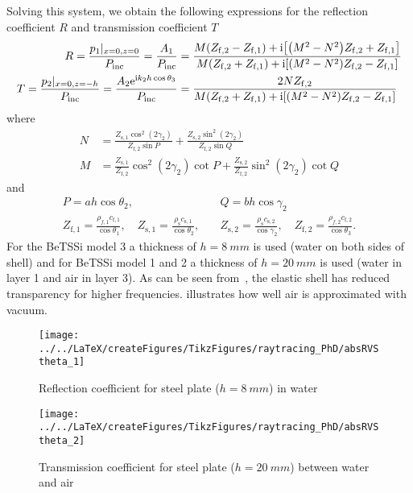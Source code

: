 Solving this system, we obtain the following expressions for the reflection coefficient $R$ and transmission coefficient $T$
\begin{align*}
	R =\frac{p_1\vert_{x=0,z=0}}{P_{\mathrm{inc}}} = \frac{A_1}{P_{\mathrm{inc}}} &= \frac{M(Z_{\mathrm{f},2}-Z_{\mathrm{f},1}) + \imag\left[\left(M^2-N^2\right)Z_{\mathrm{f},2}+Z_{\mathrm{f},1}\right]}{M(Z_{\mathrm{f},2}+Z_{\mathrm{f},1}) + \imag\left[\left(M^2-N^2\right)Z_{\mathrm{f},2}-Z_{\mathrm{f},1}\right]}\\
	T = \frac{p_2\vert_{x=0,z=-h}}{P_{\mathrm{inc}}} = \frac{A_2\euler^{\imag k_2 h \cos\theta_3}}{P_{\mathrm{inc}}} &= \frac{2NZ_{\mathrm{f},2}}{M(Z_{\mathrm{f},2}+Z_{\mathrm{f},1}) + \imag\left[\left(M^2-N^2\right)Z_{\mathrm{f},2}-Z_{\mathrm{f},1}\right]}
\end{align*}
where
\begin{align*}
	N &= \frac{Z_{\mathrm{s},1}\cos^2(2\gamma_2)}{Z_{\mathrm{f},2}\sin P} + \frac{Z_{\mathrm{s},2}\sin^2(2\gamma_2)}{Z_{\mathrm{f},2}\sin Q}\\
	M &= \frac{Z_{\mathrm{s},1}}{Z_{\mathrm{f},2}}\cos^2(2\gamma_2)\cot P + \frac{Z_{\mathrm{s},2}}{Z_{\mathrm{f},2}}\sin^2(2\gamma_2)\cot Q
\end{align*}
and
\begin{align*}
	P = a h\cos\theta_2,&\quad Q = b h\cos\gamma_2\\
	Z_{\mathrm{f},1} = \frac{\rho_{f,1} c_{\mathrm{f},1}}{\cos\theta_1},\quad Z_{\mathrm{s},1} = \frac{\rho_{\mathrm{s}} c_{\mathrm{s},1}}{\cos\theta_2},&\quad Z_{\mathrm{s},2} = \frac{\rho_{\mathrm{s}} c_{\mathrm{s},2}}{\cos\gamma_2},\quad  Z_{\mathrm{f},2} = \frac{\rho_{f,2} c_{\mathrm{f},2}}{\cos\theta_3}.
\end{align*}
For the BeTSSi model 3 a thickness of $h=\SI{8}{mm}$ is used (water on both sides of shell) and for BeTSSi model 1 and 2 a thickness of $h=\SI{20}{mm}$ is used (water in layer 1 and air in layer 3). As can be seen from~, the elastic shell has reduced transparency for higher frequencies.  illustrates how well air is approximated with vacuum.
\begin{figure}
	\centering
	\texttt{[image: ../../LaTeX/createFigures/TikzFigures/raytracing\_PhD/absRVStheta\_1]}
	\caption{Reflection coefficient for steel plate ($h=\SI{8}{mm}$) in water}
	\label{Fig:absRVStheta_1}
\end{figure}
\begin{figure}
	\centering
	\texttt{[image: ../../LaTeX/createFigures/TikzFigures/raytracing\_PhD/absRVStheta\_2]}
	\caption{Transmission coefficient for steel plate ($h=\SI{20}{mm}$) between water and air}
	\label{Fig:absRVStheta_2}
\end{figure}
